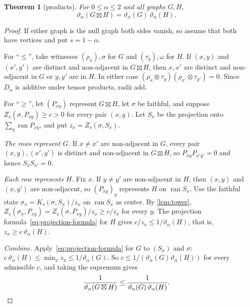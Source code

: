 \documentclass[11pt]{article}
\newtheorem{theorem}{Theorem}[section]
\theoremstyle{definition}
\newtheorem{remark}[theorem]{Remark}
\DeclareMathOperator{\ran}{ran}
\newcommand{\vt}{\vartheta}
\newcommand{\Cmin}{C_{\min}}
\newcommand{\SNS}{S_{0,\mathrm{NS}}}
\newcommand{\boxt}{\boxtimes}
\begin{document}
\begin{theorem}[products]\label{thm:product}
For $0\le\alpha\le2$ and all graphs $G,H$,
\[
 \vt_\alpha(G\boxt H)=\vt_\alpha(G)\,\vt_\alpha(H).
\]
\end{theorem}

\begin{proof}
If either graph is the null graph both sides vanish, so assume that both
have vertices and put $s=1-\alpha$.

For ``$\le$'', take witnesses $(\rho_x),\sigma$ for $G$ and $(\tau_y),\omega$
for $H$.  If $(x,y)$ and $(x',y')$ are distinct and non-adjacent in $G\boxt H$,
then $x,x'$ are distinct and non-adjacent in $G$ or $y,y'$ are in $H$.  In
either case $(\rho_x\otimes\tau_y)(\rho_{x'}\otimes\tau_{y'})=0$.  Since
$D_\alpha$ is additive under tensor products, radii add.

For ``$\ge$'', let $(P_{xy})$ represent $G\boxt H$, let $\sigma$ be faithful,
and suppose $Z_s(\sigma,P_{xy})\ge c>0$ for every pair $(x,y)$.  Let $S_x$ be
the projection onto $\sum_y\ran P_{xy}$, and put $z_x=Z_s(\sigma,S_x)$.

\emph{The rows represent $G$.}  If $x\ne x'$ are non-adjacent in $G$, every
pair $(x,y),(x',y')$ is distinct and non-adjacent in $G\boxt H$, so
$P_{xy}P_{x'y'}=0$ and hence $S_xS_{x'}=0$.

\emph{Each row represents $H$.}  Fix $x$.  If $y\ne y'$ are non-adjacent in
$H$, then $(x,y)$ and $(x,y')$ are non-adjacent, so $(P_{xy})_y$ represents
$H$ on $\ran S_x$.  Use the faithful state $\sigma_x=K_s(\sigma,S_x)/z_x$ on
$\ran S_x$ as center.  By \cref{lem:tower},
$Z_s(\sigma_x,P_{xy})=Z_s(\sigma,P_{xy})/z_x\ge c/z_x$ for every $y$.  The
projection formula~\eqref{eq:projection-formula} for $H$ gives
$c/z_x\le1/\vt_\alpha(H)$, that is, $z_x\ge c\,\vt_\alpha(H)$.

\emph{Combine.}  Apply~\eqref{eq:projection-formula} for $G$ to $(S_x)$ and
$\sigma$: $c\,\vt_\alpha(H)\le\min_xz_x\le1/\vt_\alpha(G)$.  So
$c\le1/(\vt_\alpha(G)\vt_\alpha(H))$ for every admissible $c$, and taking the
supremum gives
\[
 \frac1{\vt_\alpha(G\boxt H)}\le\frac1{\vt_\alpha(G)\,\vt_\alpha(H)} .
 \qedhere
\]
\end{proof}

\end{document}

